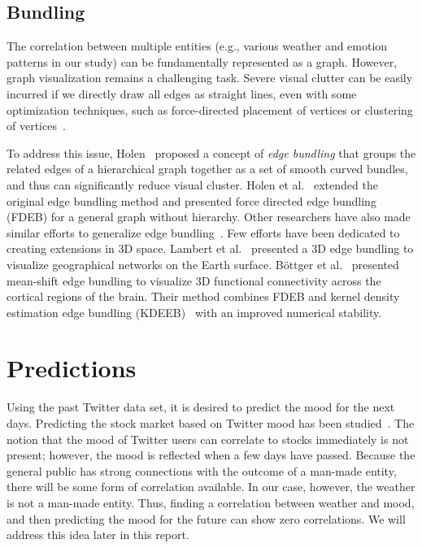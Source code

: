 \subsection{Bundling}

The correlation between multiple entities (e.g., various weather and emotion patterns in our study) can be fundamentally represented as a graph. However, graph visualization remains a challenging task. Severe visual clutter can be easily incurred if we directly draw all edges as straight lines, even with some optimization techniques, such as force-directed placement of vertices or clustering of vertices~\cite{KAUFMANN2001}.

To address this issue, Holen~\cite{holten2006hierarchical} proposed a concept of \emph{edge bundling} that groups the related edges of a hierarchical graph together as a set of smooth curved bundles, and thus can significantly reduce visual cluster. Holen et al.~\cite{holten2009force} extended the original edge bundling method and presented force directed edge bundling (FDEB) for a general graph without hierarchy. Other researchers have also made similar efforts to generalize edge bundling~\cite{cui2008geometry,telea2010image,ersoy2011skeleton,gansner2011multilevel}. Few efforts have been dedicated to creating extensions in 3D space. Lambert et al.~\cite{5571244} presented a 3D edge bundling to visualize geographical networks on the Earth surface. B\"{o}ttger et al.~\cite{bottger2014three} presented mean-shift edge bundling to visualize 3D functional connectivity across the cortical regions of the brain. Their method combines FDEB and kernel density estimation edge bundling (KDEEB)~\cite{hurter2012graph} with an improved numerical stability.

\section{Predictions}

Using the past Twitter data set, it is desired to predict the mood for the next days. Predicting the stock market based on Twitter mood has been studied~\cite{bollen2011twitter}. The notion that the mood of Twitter users can correlate to stocks immediately is not present; however, the mood is reflected when a few days have passed. Because the general public has strong connections with the outcome of a man-made entity, there will be some form of correlation available. In our case, however, the weather is not a man-made entity. Thus, finding a correlation between weather and mood, and then predicting the mood for the future can show zero correlations. We will address this idea later in this report.
